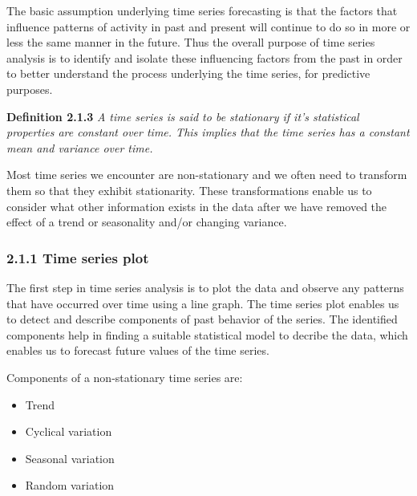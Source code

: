       \vspace{1em}

      The basic assumption underlying time series forecasting is that the factors that influence patterns of activity in past and present will continue to do so in more or less the same manner in the future. Thus the overall purpose of time series analysis is to identify and isolate these influencing factors from the past in order to better understand the process underlying the time series, for predictive purposes.

      \vspace{1em}

      \textbf{Definition 2.1.3} \cite{Watson2025} \textit{A time series is said to be stationary if it's statistical properties are constant over time. This implies that the time series has a constant mean and variance over time.}

      \vspace{1em}

      Most time series we encounter are non-stationary and we often need to transform them so that they exhibit stationarity. These transformations enable us to consider what other information exists in the data after we have removed the effect of a trend or seasonality and/or changing variance.

      \subsubsection*{2.1.1 Time series plot}

      The first step in time series analysis is to plot the data and observe any patterns that have occurred over time using a line graph. The time series plot enables us to detect and describe components of past behavior of the series. The identified components help in finding a suitable statistical model to decribe the data, which enables us to forecast future values of the time series.

      \vspace{1em}

      Components of a non-stationary time series are:
      \begin{itemize}
         \item Trend
         \item Cyclical variation
         \item Seasonal variation
         \item Random variation
      \end{itemize}

